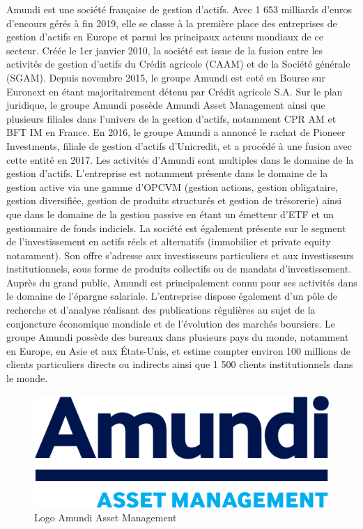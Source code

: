 Amundi est une société française de gestion d'actifs. Avec 1 653 milliards d'euros d'encours gérés à fin 2019, elle se classe à la première place des entreprises de gestion d'actifs en Europe et parmi les principaux acteurs mondiaux de ce secteur.
Créée le 1er janvier 2010, la société est issue de la fusion entre les activités de gestion d'actifs du Crédit agricole (CAAM) et de la Société générale (SGAM). Depuis novembre 2015, le groupe Amundi est coté en Bourse sur Euronext en étant majoritairement détenu par Crédit agricole S.A.
Sur le plan juridique, le groupe Amundi possède Amundi Asset Management ainsi que plusieurs filiales dans l'univers de la gestion d'actifs, notamment CPR AM et BFT IM en France. En 2016, le groupe Amundi a annoncé le rachat de Pioneer Investments, filiale de gestion d'actifs d'Unicredit, et a procédé à une fusion avec cette entité en 2017.
Les activités d'Amundi sont multiples dans le domaine de la gestion d'actifs. L'entreprise est notamment présente dans le domaine de la gestion active via une gamme d'OPCVM (gestion actions, gestion obligataire, gestion diversifiée, gestion de produits structurés et gestion de trésorerie) ainsi que dans le domaine de la gestion passive en étant un émetteur d'ETF et un gestionnaire de fonds indiciels. La société est également présente sur le segment de l'investissement en actifs réels et alternatifs (immobilier et private equity notamment). Son offre s’adresse aux investisseurs particuliers et aux investisseurs institutionnels, sous forme de produits collectifs ou de mandats d’investissement. Auprès du grand public, Amundi est principalement connu pour ses activités dans le domaine de l'épargne salariale. L'entreprise dispose également d'un pôle de recherche et d'analyse réalisant des publications régulières au sujet de la conjoncture économique mondiale et de l'évolution des marchés boursiers.
Le groupe Amundi possède des bureaux dans plusieurs pays du monde, notamment en Europe, en Asie et aux États-Unis, et estime compter environ 100 millions de clients particuliers directs ou indirects ainsi que 1 500 clients institutionnels dans le monde.
\clearpage
\begin{figure}[ht]
    \centering
    \includegraphics[width=\columnwidth]{img/amundiLogo.png}
    \caption{Logo Amundi Asset Management}
    \label{fig:amundiLogo}
\end{figure}

